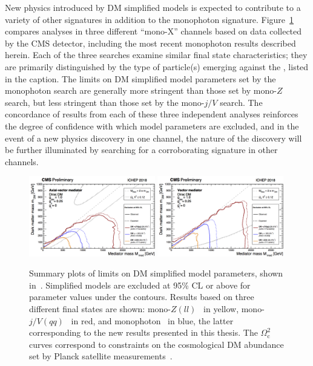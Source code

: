\documentclass[oneside, letterpaper, 12pt, oldfontcommands]{memoir}
\begin{document}
New physics introduced by DM simplified models is expected to contribute to a variety of other signatures in addition to the monophoton signature. Figure~\ref{fig:dmsimp_ichep2018} compares
analyses in three different ``mono-X'' channels based on data collected by the CMS detector, including the most recent monophoton results described herein. Each of the three
searches examine similar final state characteristics; they are primarily distinguished by the type of particle(s) emerging against the \vecMET, listed in the caption.
The limits on DM simplified model parameters set by the monophoton search are generally more stringent than those set by mono-$Z$ search, but less stringent
than those set by the mono-$j/V$ search. The concordance of results from each of these three independent analyses reinforces the degree of confidence with which model
parameters are excluded, and in the event of a new physics discovery in one channel, the nature of the discovery will be further illuminated by searching for a corroborating
signature in other channels.

\begin{figure}[hbtb]
  \begin{center}
    \includegraphics[width=0.49\textwidth]{Figures/dmsimp_ichep2018_av.png}
    \includegraphics[width=0.49\textwidth]{Figures/dmsimp_ichep2018_v.png}
    \caption{Summary plots of limits on DM simplified model parameters, shown in~\cite{ref:dmsummaryplots_ichep2018}. Simplified models are excluded at 95\% CL or above
    for parameter values under the contours.
    Results based on three different final states are shown: mono-$Z(ll)$~\cite{ref:epjc/s10052-018-5740-1} in yellow, mono-$j/V(qq)$~\cite{ref:PhysRevD.97.092005} in red, and monophoton~\cite{ref:1810.00196} in blue,
    the latter corresponding to the new results presented in this thesis. The $\Omega_\mathrm{c}^{2}$ curves correspond to constraints on the cosmological DM abundance set by Planck satellite measurements~\cite{ref:planck2018_cosparams}.}
    \label{fig:dmsimp_ichep2018}
  \end{center}
\end{figure}
\end{document}
